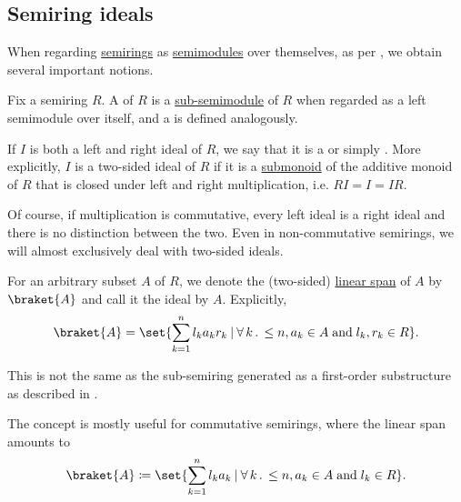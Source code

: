 \subsection{Semiring ideals}\label{subsec:semiring_ideals}

When regarding \hyperref[def:semiring]{semirings} as \hyperref[def:semimodule]{semimodules} over themselves, as per , we obtain several important notions.

\begin{definition}\label{def:semiring_ideal}\mimprovised
  Fix a semiring \( R \). A  of \( R \) is a \hyperref[def:semimodule/submodel]{sub-semimodule} of \( R \) when regarded as a left semimodule over itself, and a  is defined analogously.

  If \( I \) is both a left and right ideal of \( R \), we say that it is a  or simply . More explicitly, \( I \) is a two-sided ideal of \( R \) if it is a \hyperref[def:monoid/submodel]{submonoid} of the additive monoid of \( R \) that is closed under left and right multiplication, i.e. \( RI = I = IR \).

  Of course, if multiplication is commutative, every left ideal is a right ideal and there is no distinction between the two. Even in non-commutative semirings, we will almost exclusively deal with two-sided ideals.

  \begin{thmenum}
     For an arbitrary subset \( A \) of \( R \), we denote the (two-sided) \hyperref[def:semimodule/submodel]{linear span} of \( A \) by \( \braket{ A } \) and call it the ideal  by \( A \). Explicitly,
    \begin{equation*}
      \braket{ A } = \set{ \sum_{k=1}^n l_k a_k r_k \given \qforall k \leq n, a_k \in A \T{and} l_k, r_k \in R }.
    \end{equation*}

    This is not the same as the sub-semiring generated as a first-order substructure as described in .

    The concept is mostly useful for commutative semirings, where the linear span amounts to
    \begin{equation*}
      \braket{ A } \coloneqq \set{ \sum_{k=1}^n l_k a_k \given \qforall k \leq n, a_k \in A \T{and} l_k \in R }.
    \end{equation*}


\end{thmenum}
\end{definition}
